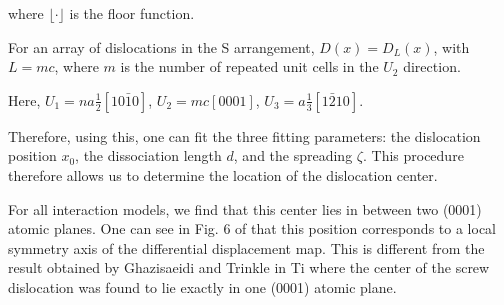 \documentclass[11pt]{article}
\begin{document}
where \(\lfloor \cdot \rfloor\) is the floor function. 

For an array of dislocations in the S arrangement, \(D(x) = D_L(x)\),
with \(L = mc\), where \(m\) is the number of repeated unit cells in
the \(U_2\) direction. 

Here, \(U_1 = na \frac{1}{2} [10\bar{1}0]\), \(U_2 = mc [0001]\), 
\(U_3 =  a \frac{1}{3} [1\bar{2}10]\).

Therefore, using this, one can fit the three fitting parameters:
the dislocation position \(x_0\), the dissociation length \(d\), and the
spreading \(\zeta\). This procedure therefore allows us to determine the
location of the dislocation center.

For all interaction models, we find that this center lies in
between two (0001) atomic planes. One can see in Fig. 6 of
\cite{Clouet2012} that this position corresponds to a local symmetry
axis of the differential displacement map. This is different from
the result obtained by Ghazisaeidi and Trinkle
\cite{Ghazisaeidi2012} in Ti where the center of the screw
dislocation was found to lie exactly in one (0001) atomic plane.

\newpage
\end{document}
